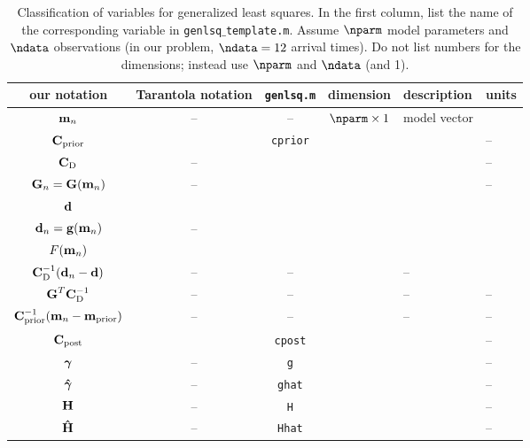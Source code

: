 \begin{table}[h]
\caption[]{{
Classification of variables for generalized least squares. In the first column, list the name of the corresponding variable in {\tt genlsq$\_$template.m}. Assume $\nparm$ model parameters and $\ndata$ observations (in our problem, $\ndata=12$ arrival times). Do not list numbers for the dimensions; instead use $\nparm$ and $\ndata$ (and 1).
\label{tab:vars}
}}
\begin{spacing}{1.4}
\hspace{-1cm}
\begin{tabular}{c|c|c|c|l|l}
\hline
our notation & Tarantola notation & {\tt genlsq.m} & dimension & description \hspace{2cm} & units \hspace{0.5cm} \\
\hline\hline 
$\mbox{${\bf m}$}_n$
& --
& --
& $\nparm \times 1$ 
& model vector
&
\\ \hline
$\mbox{${\bf C}$}_{\rm prior}$
& 
& \verb+cprior+
&
&
& --
\\ \hline
$\mbox{${\bf C}$}_{\rm D}$
& --
&
&
&
& --
\\ \hline
$\mbox{${\bf G}$}_n = \mbox{${\bf G}$}(\mbox{${\bf m}$}_n)$
& --
& 
&
&
& --
\\ \hline
$\mbox{${\bf d}$}$
&
&
&
& 
\\ \hline
$\mbox{${\bf d}$}_n = \mbox{${\bf g}$}(\mbox{${\bf m}$}_n)$
& --
&
&
& 
\\ \hline
\hline
$F(\mbox{${\bf m}$}_n)$
&
&
&
&
\\ \hline
$\mbox{${\bf C}$}_{\rm D}^{-1} (\mbox{${\bf d}$}_n - \mbox{${\bf d}$})$
& --
& --
&
& --
\\ \hline
$\mbox{${\bf G}$}^T\mbox{${\bf C}$}_{\rm D}^{-1}$
& --
& --
&
& --
& --
\\ \hline
$\mbox{${\bf C}$}_{\rm prior}^{-1} (\mbox{${\bf m}$}_n - \mbox{${\bf m}$}_{\rm prior})$
& --
& --
&
& --
& --
\\ \hline
\hline
$\mbox{${\bf C}$}_{\rm post}$
& 
& \verb+cpost+
&
& 
& --
\\ \hline
$\mbox{\boldmath $\bf \gamma$}$
& --
& \verb+g+
&
&
& --
\\ \hline
$\mbox{\boldmath{$\hat{\gamma}$}}$
& --
& \verb+ghat+
&
&
& --
\\ \hline
$\mbox{${\bf H}$}$
& --
& \verb+H+
&
&
& --
\\ \hline
$\mbox{\boldmath{$\hat{\rm H}$}}$
& --
& \verb+Hhat+
&
&
& --
\\ \hline
\hline
\end{tabular}
\end{spacing}
\end{table}
